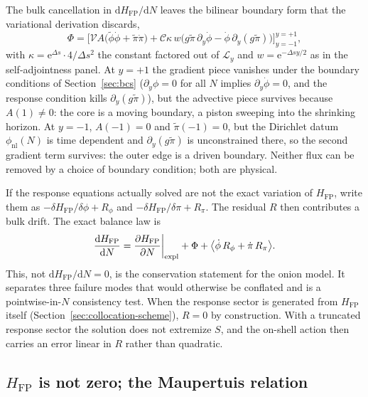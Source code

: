 \documentclass[a4paper,11pt]{article}
\newcommand{\semibold}[1]{{\fontseries{b}\selectfont{#1}}}
\newcommand{\para}[1]{\par\vspace{2mm}\noindent\semibold{{#1.}---}\ignorespaces}
\renewcommand{\d}{\mathrm{d}}
\newcommand{\e}[1]{\mathrm{e}^{{#1}}}
\newcommand{\Ny}{N}                          %
\newcommand{\field}{\phi}                    %
\newcommand{\mom}{\pi}                       %
\newcommand{\phinl}{\field_{\mathrm{nl}}}    %
\newcommand{\rfield}{\widetilde\field}       %
\newcommand{\rmom}{\widetilde\mom}           %
\newcommand{\yco}{y}                         %
\newcommand{\Deltas}{\Delta s}                %
\newcommand{\advcoef}{A}                     %
\newcommand{\weightfn}{w}                    %
\newcommand{\Lop}{\mathcal{L}_\yco}          %
\newcommand{\volel}{\mathcal{V}}             %
\newcommand{\Cpref}{\mathcal{C}}             %
\newcommand{\Hfp}{H_{\mathrm{FP}}}            %
\newcommand{\gpref}{g}                        %
\begin{document}
\para{Boundary flux} The bulk cancellation in $\d\Hfp/\d\Ny$ leaves the
bilinear boundary form that the variational derivation discards,
\begin{equation}
    \Phi = \Big[\volel\advcoef\big(\rfield\dot\field+\rmom\dot\mom\big)
    + \Cpref\kappa\,\weightfn\big(\gpref\rmom\,\partial_\yco\dot\field - \dot\field\,\partial_\yco(\gpref\rmom)\big)\Big]_{\yco=-1}^{\yco=+1} ,
    \label{eq:hfp-flux}
\end{equation}
with $\kappa=\e{\Deltas}\cdot4/\Deltas^2$ the constant factored out of
$\Lop$ and $\weightfn=\e{-\Deltas\yco/2}$ as in the self-adjointness
panel. At $\yco=+1$ the gradient piece vanishes under the boundary
conditions of Section~\ref{sec:bcs} ($\partial_\yco\field=0$ for all $\Ny$
implies $\partial_\yco\dot\field=0$, and the response condition kills
$\partial_\yco(\gpref\rmom)$), but the advective piece survives because
$\advcoef(1)\neq0$: the core is a moving boundary, a piston sweeping into
the shrinking horizon. At $\yco=-1$, $\advcoef(-1)=0$ and $\rmom(-1)=0$,
but the Dirichlet datum $\phinl(\Ny)$ is time dependent and
$\partial_\yco(\gpref\rmom)$ is unconstrained there, so the second gradient
term survives: the outer edge is a driven boundary. Neither flux can be
removed by a choice of boundary condition; both are physical.

\para{Truncation} If the response equations actually solved are not the
exact variation of $\Hfp$, write them as $-\delta\Hfp/\delta\field+R_\field$
and $-\delta\Hfp/\delta\mom+R_\mom$. The residual $R$ then contributes a
bulk drift. The exact balance law is
\begin{equation}
    \frac{\d\Hfp}{\d\Ny}
    = \frac{\partial\Hfp}{\partial\Ny}\bigg|_{\rm expl} + \Phi
    + \big\langle\dot\field\,R_\field + \dot\mom\,R_\mom\big\rangle .
    \label{eq:balance-law}
\end{equation}
This, not $\d\Hfp/\d\Ny=0$, is the conservation statement for the onion
model. It separates three failure modes that would otherwise be conflated
and is a pointwise-in-$\Ny$ consistency test. When the response sector is
generated from $\Hfp$ itself (Section~\ref{sec:collocation-scheme}),
$R=0$ by construction. With a truncated response sector the solution does
not extremize $S$, and the on-shell action then carries an error linear in
$R$ rather than quadratic.

\subsection{$\Hfp$ is not zero; the Maupertuis relation}
\end{document}
